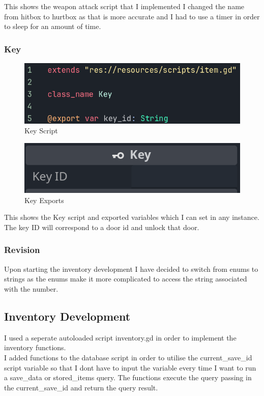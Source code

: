 \documentclass{article}
\begin{document}
        This shows the weapon attack script that I implemented I changed the name from hitbox to hurtbox as that is more accurate and I had to use a timer in order to sleep for an amount of time.\\
        \subsubsection{Key}
        \begin{multicols}{2}
                \begin{figure}[H]
                        \centering
                        \includegraphics[width = \columnwidth]{images/development/Key_script.PNG}
                        \caption{Key Script}
                \end{figure}
                \begin{figure}[H]
                        \centering
                        \includegraphics[width = 0.9\columnwidth]{images/development/Key_export.PNG}
                        \caption{Key Exports}
                \end{figure}
        \end{multicols}
        \[\]
        This shows the Key script and exported variables which I can set in any instance. The key ID will correspond to a door id and unlock that door.\\
        \subsubsection{Revision}
        Upon starting the inventory development I have decided to switch from enums to strings as the enums make it more complicated to access the string associated with the number.\\
        \subsection{Inventory Development}
        I used a seperate autoloaded script inventory.gd in order to implement the inventory functions.\\
        I added functions to the database script in order to utilise the current\_save\_id script variable so that I dont have to input the variable every time I want to run a save\_data or stored\_items query. The functions execute the query passing in the current\_save\_id and return the query result.\\
\end{document}

